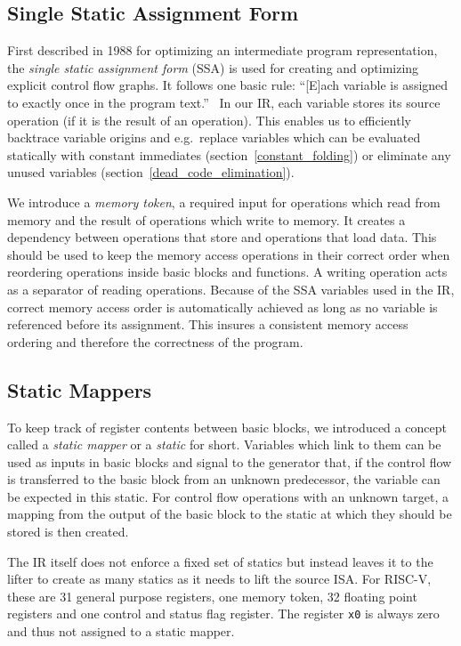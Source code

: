 \documentclass[course=eragp]{aspdoc}
\begin{document}
\subsection{Single Static Assignment Form}\label{ssa}

First described in 1988 for optimizing an intermediate program representation\cite{ssa_proposal},
the \emph{single static assignment form} (SSA) is used for creating and optimizing explicit control
flow graphs. It follows one basic rule: ``[E]ach variable is
assigned to exactly once in the program text.''~\cite{ssa_proposal} In our IR, each variable
stores its source operation (if it is the result of an operation). This enables us to efficiently
backtrace variable origins and e.g.\ replace variables which can be evaluated statically with constant
immediates (section~\ref{constant_folding}) or eliminate any unused variables (section~\ref{dead_code_elimination}).

We introduce a \emph{memory token}, a required input for operations which read from memory and the
result of operations which write to memory. It creates a dependency between operations that store
and operations that load data. This should be used to keep the memory access operations
in their correct order when reordering operations inside basic blocks and functions. A writing
operation acts as a separator of reading operations. Because of the SSA variables used in the IR,
correct memory access order is automatically achieved as long as no variable is referenced before
its assignment. This insures a consistent memory access ordering and therefore the correctness of the
program.

\subsection{Static Mappers}\label{statics}

To keep track of register contents between basic blocks, we introduced a concept called a
\textit{static mapper} or a \textit{static} for short.
Variables which link to them can be used as inputs in basic blocks and signal to the generator that, if the control flow is transferred to the basic block from an unknown predecessor, the variable can be expected in this static.
For control flow operations with an unknown target, a mapping from the output of the basic block to the static at which they should be stored is then created.

\par

The IR itself does not enforce a fixed set of statics but instead leaves it to the lifter to create as many statics as it needs to lift the source ISA.
For RISC-V, these are 31 general purpose registers, one memory token, 32 floating point registers
and one control and status flag register. The register \texttt{x0} is always zero and thus not
assigned to a static mapper.
\end{document}
